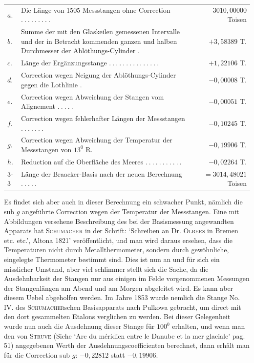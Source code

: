 %
\begin{center}
\begin{tabular}{@{}l p{.54\linewidth} r@{}}
\(a.\)&Die Länge von 1505 Messstangen ohne Correction \(.\ .\ .\ .\ .\ .\ .\ .\ .\)&\(3010{,}00000\) Toisen\\
\(b.\)&Summe der mit den Glaskeilen gemessenen Intervalle und der in Betracht kommenden ganzen und halben Durchmesser der Ablöthungs-Cylinder \(.\)&\(+3{,}58389\) T.\\
\(c.\)&Länge der Ergänzungsstange \(.\ .\ .\ .\ .\ .\ .\ .\ .\ .\ .\ .\ .\ .\ .\)&\(+1{,}22106\) T.\\
\(d.\)&Correction wegen Neigung der Ablöthungs-Cylinder gegen die Lothlinie \(.\)&\(-0{,}00008\) T.\\
\(e.\)&Correction wegen Abweichung der Stangen vom Alignement \(.\ .\ .\ .\ .\)&\(-0{,}00051\) T.\\
\(f.\)&Correction wegen fehlerhafter Längen der Messstangen \(.\ .\ .\ .\ .\ .\ .\)&\(-0{,}10245\) T.\\
\(g.\)&Correction wegen Abweichung der Temperatur der Messstangen von \(13^{0}\) R.&\(-0{,}19906\) T.\\
\(h.\)&Reduction auf die Oberfläche des Meeres \(.\ .\ .\ .\ .\ .\ .\ .\ .\ .\ .\)&\(-0{,}02264\) T.\\\cline{3-3}
&Länge der Braacker-Basis nach der neuen Berechnung \(.\ .\ .\ .\ .\)&\(=3014{,}48021\) Toisen
\end{tabular}
\end{center}

Es findet sich aber auch in dieser Berechnung ein schwacher Punkt, nämlich die sub \(g\) angeführte Correction wegen der Temperatur der Messstangen. Eine mit Abbildungen versehene Beschreibung des bei der Basismessung angewandten Apparats hat \textsc{Schumacher} in der Schrift: ‘Schreiben an Dr. \textsc{Olbers} in Bremen etc. etc.’, Altona 1821’ veröffentlicht, und man wird daraus ersehen, dass die Temperaturen nicht durch Metallthermometer, sondern durch gewöhnliche, eingelegte Thermometer bestimmt sind. Dies ist nun an und für sich ein misslicher Umstand, aber viel schlimmer stellt sich die Sache, da die Ausdehnbarkeit der Stangen nur aus einigen im Felde vorgenommenen Messungen der Stangenlängen am Abend und am Morgen abgeleitet wird. Es kann aber diesem Uebel abgeholfen werden. Im Jahre 1853 wurde nemlich die Stange No. IV. des \textsc{Schumacher}schen Basisapparats nach Pulkowa gebracht, um direct mit den dort gesammelten Etalons verglichen zu werden. Bei dieser Gelegenheit wurde nun auch die Ausdehnung dieser Stange für \(100^{0}\) erhalten, und wenn man den von \textsc{Struve} (Siehe ‘Arc du méridien entre le Danube et la mer glaciale’ pag. 51) angegebenen Werth der Ausdehnungscoefficienten berechnet, dann erhält man für die Correction sub \(g\): \(-0{,}22812\) statt \(-0{,}19906\).

